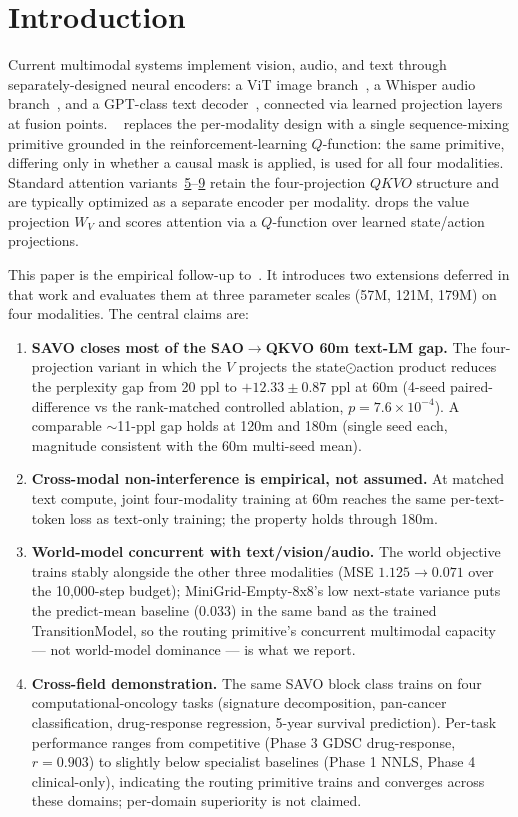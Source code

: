 \section{Introduction}\label{sec:1}

Current multimodal systems implement vision, audio, and text through separately-designed neural encoders: a ViT image branch~\cite{ref2}, a Whisper audio branch~\cite{ref3}, and a GPT-class text decoder~\cite{ref4}, connected via learned projection layers at fusion points. \QC{}~\cite{ref1} replaces the per-modality design with a single sequence-mixing primitive grounded in the reinforcement-learning $Q$-function: the same primitive, differing only in whether a causal mask is applied, is used for all four modalities. Standard attention variants~\hyperlink{cite.ref5}{5}--\hyperlink{cite.ref9}{9} retain the four-projection $QKVO$ structure and are typically optimized as a separate encoder per modality. \QC{} drops the value projection $W_V$ and scores attention via a $Q$-function over learned state/action projections.

This paper is the empirical follow-up to~\cite{ref1}. It introduces two extensions deferred in that work and evaluates them at three parameter scales (57M, 121M, 179M) on four modalities. The central claims are:

\begin{enumerate}[leftmargin=*,labelindent=\parindent,itemsep=0.6ex]
\item \textbf{SAVO closes most of the SAO$\to$QKVO 60m text-LM gap.} The four-projection variant in which the $V$ projects the state$\odot$action product reduces the perplexity gap from 20 ppl to $+12.33 \pm 0.87$ ppl at 60m (4-seed paired-difference vs the rank-matched controlled ablation, $p = 7.6 \times 10^{-4}$). A comparable ${\sim}$11-ppl gap holds at 120m and 180m (single seed each, magnitude consistent with the 60m multi-seed mean).
\item \textbf{Cross-modal non-interference is empirical, not assumed.} At matched text compute, joint four-modality training at 60m reaches the same per-text-token loss as text-only training; the property holds through 180m.
\item \textbf{World-model concurrent with text/vision/audio.} The world objective trains stably alongside the other three modalities (MSE $1.125 \to 0.071$ over the 10,000-step budget); MiniGrid-Empty-8x8's low next-state variance puts the predict-mean baseline (0.033) in the same band as the trained TransitionModel, so the routing primitive's concurrent multimodal capacity --- not world-model dominance --- is what we report.
\item \textbf{Cross-field demonstration.} The same SAVO block class trains on four computational-oncology tasks (signature decomposition, pan-cancer classification, drug-response regression, 5-year survival prediction). Per-task performance ranges from competitive (Phase 3 GDSC drug-response, $r{=}0.903$) to slightly below specialist baselines (Phase 1 NNLS, Phase 4 clinical-only), indicating the routing primitive trains and converges across these domains; per-domain superiority is not claimed.
\end{enumerate}


